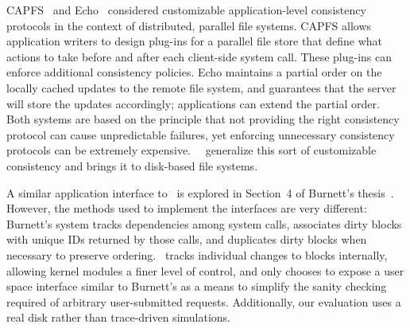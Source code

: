 CAPFS~\cite{vilayannur05providing} and Echo~\cite{mann94coherent}
considered
customizable application-level consistency protocols
in the context of distributed, parallel file systems.
%
CAPFS allows application writers to design plug-ins for a parallel file store
that define what actions to take before and after each client-side system
call.
%
These plug-ins can enforce additional consistency policies.
%
Echo maintains a partial order on the locally cached updates to the remote file
system, and guarantees that the server will store the updates accordingly;
applications can extend the partial order.
%
Both systems are based on the principle that not providing the right
consistency protocol can cause unpredictable failures, yet enforcing
unnecessary consistency protocols can be extremely expensive.
%
%
\Kudos\ \patchgroups\ generalize this sort of customizable consistency
and brings it to disk-based file systems.

A similar application interface to \patchgroups\ is explored in
Section~4 of Burnett's thesis~\cite{burnett06information}. However, the methods
used to implement the interfaces are very different: Burnett's system tracks
dependencies among system calls, associates dirty blocks with
unique IDs returned by those calls, and duplicates dirty blocks when necessary
to preserve ordering. \Kudos\ tracks individual changes to blocks internally,
allowing kernel modules a finer level of control, and only chooses to expose a
user space interface similar to Burnett's as a means to simplify the sanity
checking required of arbitrary user-submitted requests.
%
Additionally, our evaluation uses a real disk rather than trace-driven
simulations.

